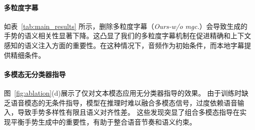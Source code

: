 \paragraph{多粒度字幕}
如表~\ref{tab:main_results} 所示，删除多粒度字幕（\textit{Ours-w/o mgc.}）会导致生成的手势的语义相关性显著下降。这凸显了我们的多粒度字幕机制在促进精确和上下文感知的语义注入方面的重要性。在这种情况下，音频作为初始条件，而本地字幕提供精细条件。

\paragraph{多模态无分类器指导}
图~\ref{fig:ablation}(d)展示了仅对文本模态应用无分类器指导的效果。
由于训练时缺乏语音模态的无条件指导，模型在推理时难以融合多模态信号，过度依赖语音输入，导致手势多样性有限且语义对齐性差。
这些发现突显了组合多模态指导在实现平衡手势生成中的重要性，有助于整合语音节奏和语义约束。

